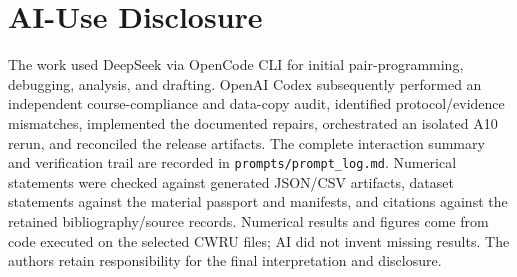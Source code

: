 ﻿\documentclass[11pt,a4paper]{article}
\begin{document}
\section{AI-Use Disclosure}

The work used DeepSeek via OpenCode CLI for initial pair-programming, debugging, analysis, and drafting. OpenAI Codex subsequently performed an independent course-compliance and data-copy audit, identified protocol/evidence mismatches, implemented the documented repairs, orchestrated an isolated A10 rerun, and reconciled the release artifacts. The complete interaction summary and verification trail are recorded in \texttt{prompts/prompt\_log.md}. Numerical statements were checked against generated JSON/CSV artifacts, dataset statements against the material passport and manifests, and citations against the retained bibliography/source records. Numerical results and figures come from code executed on the selected CWRU files; AI did not invent missing results. The authors retain responsibility for the final interpretation and disclosure.

\begingroup
\small


\endgroup
\end{document}
